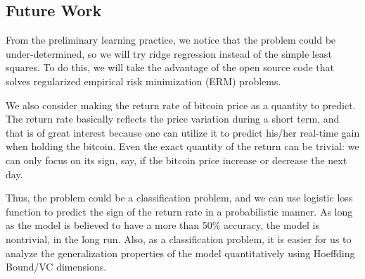 \documentclass[9pt,twocolumn,twoside]{ilcss}
\begin{document}
\subsection*{Future Work}
From the preliminary learning practice, we notice that the problem could be under-determined, so we will try ridge regression instead of the simple least squares. To do this, we will take the advantage of the open source code that solves regularized empirical risk minimization (ERM) problems.

We also consider making the return rate of bitcoin price as a quantity to predict. The return rate basically reflects the price variation during a short term, and that is of great interest because one can utilize it to predict his/her real-time gain when holding the bitcoin. Even the exact quantity of the return can be trivial: we can only focus on its sign, say, if the bitcoin price increase or decrease the next day. 

Thus, the problem could be a classification problem, and we can use logistic loss function to predict the sign of the return rate in a probabilistic manner. As long as the model is believed to have a more than 50\% accuracy, the model is nontrivial, in the long run. Also, as a classification problem, it is easier for us to analyze the generalization properties of the model quantitatively using Hoeffding Bound/VC dimensions.



\end{document}
